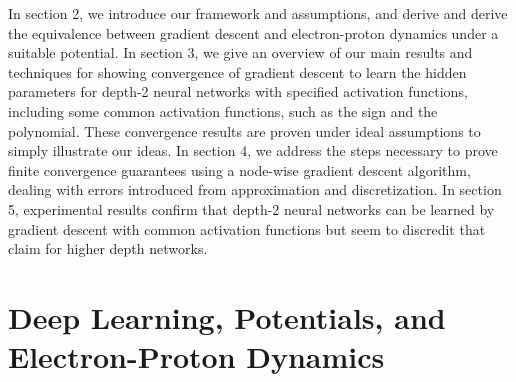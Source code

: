 \documentclass{article}
\begin{document}
In section 2, we introduce our framework and assumptions, and derive and derive the equivalence between gradient descent and electron-proton dynamics under a suitable potential. In section 3, we give an overview of our main results and techniques for showing convergence of gradient descent to learn the hidden parameters for depth-2 neural networks with specified activation functions, including some common activation functions, such as the sign and the polynomial. These convergence results are proven under ideal assumptions to simply illustrate our ideas. In section 4, we address the steps necessary to prove finite convergence guarantees using a node-wise gradient descent algorithm, dealing with errors introduced from approximation and discretization. In section 5, experimental results confirm that depth-2 neural networks can be learned by gradient descent with common activation functions but seem to discredit that claim for higher depth networks.  


\section{Deep Learning, Potentials, and Electron-Proton Dynamics}
\end{document}
